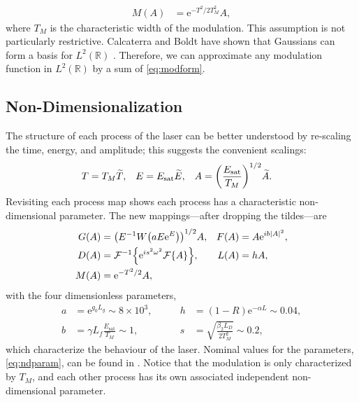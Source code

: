 \documentclass[10pt,twocolumn,a4paper]{article}
\let\originalleft\left
\let\originalright\right
\renewcommand{\left}{\mathopen{}\mathclose\bgroup\originalleft}
\renewcommand{\right}{\aftergroup\egroup\originalright}
\newcommand{\Es}{E_{\textrm{sat}}}
\newcommand{\FT}[1]{\mathcal{F}\left\{ #1 \right\}}
\newcommand{\FTi}[1]{\mathcal{F}^{-1}\left\{ #1 \right\}}
\begin{document}
\begin{align}
	M(A) &= \textrm{e}^{-T^2 / 2 T_M^2} A,
	\label{eq:modform}
\end{align}
where $T_M$ is the characteristic width of the modulation. This assumption is not particularly restrictive. Calcaterra and Boldt have shown that Gaussians can form a basis for $L^2(\mathbb{R})$ \cite{calcaterra2008a}. Therefore, we can approximate any modulation function in $L^2(\mathbb{R})$ by a sum of \eqref{eq:modform}.

\subsection{Non-Dimensionalization}
The structure of each process of the laser can be better understood by re-scaling the time, energy, and amplitude; this suggests the convenient scalings:
\begin{align}
	T &= T_M \widetilde{T},& E &= \Es \widetilde{E},& A &= \left( \frac{\Es}{T_M} \right)^{1/2} \widetilde{A}.
\end{align}
Revisiting each process map shows each process has a characteristic non-dimensional parameter. The new mappings---after dropping the tildes---are
\begin{equation}
	\begin{aligned}
		G(A) &= \left(E^{-1} W \left( a E \textrm{e}^{E}\right) \right)^{1/2} A, & F(A) &= A \textrm{e}^{i b |A|^2}, \\
		D(A) &= \FTi{\textrm{e}^{i s^2 \omega^2} \FT{A}}, & L(A) &= h A, \\
		M(A) &= \textrm{e}^{-T^2 / 2} A,
		\label{eq:effects}
	\end{aligned}
\end{equation}
with the four dimensionless parameters,
\begin{equation}
	\begin{aligned}
		a &= \textrm{e}^{g_0 L_g} \sim 8 \times 10^3,& \qquad h &= (1 - R) \textrm{e}^{-\alpha L} \sim 0.04, \\
		b &= \gamma L_f \frac{\Es}{T_M} \sim 1,& \qquad s &= \sqrt{\frac{\beta_2 L_D}{2 T_M^2}} \sim 0.2,
		\label{eq:ndparam}
	\end{aligned}
\end{equation}
which characterize the behaviour of the laser. Nominal values for the parameters, \eqref{eq:ndparam}, can be found in \cite{agrawal2002, agrawal2013, bohun2015, burgoyne2014, burgoyneemail, finot2008, li1998, litchinitser1997, peng2018, shtyrina2017, tamura1993, tamura1996, tomlinson1984, usechak2005, yamashita2009, yarutkina2013}. Notice that the modulation is only characterized by $T_M$, and each other process has its own associated independent non-dimensional parameter.
\end{document}
